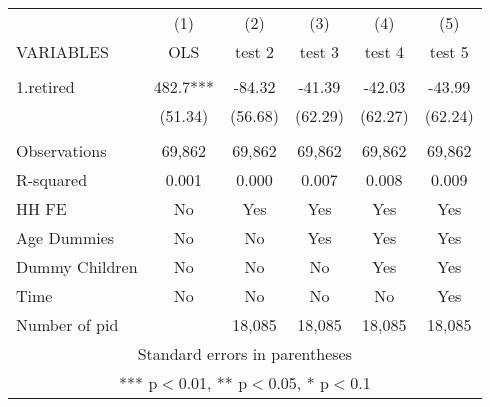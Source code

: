 \begin{tabular}{lccccc} \hline
 & (1) & (2) & (3) & (4) & (5) \\
VARIABLES & OLS & test 2 & test 3 & test 4 & test 5 \\ \hline
 &  &  &  &  &  \\
1.retired & 482.7*** & -84.32 & -41.39 & -42.03 & -43.99 \\
 & (51.34) & (56.68) & (62.29) & (62.27) & (62.24) \\
 &  &  &  &  &  \\
Observations & 69,862 & 69,862 & 69,862 & 69,862 & 69,862 \\
R-squared & 0.001 & 0.000 & 0.007 & 0.008 & 0.009 \\
HH FE & No & Yes & Yes & Yes & Yes \\
Age Dummies & No & No & Yes & Yes & Yes \\
Dummy Children & No & No & No & Yes & Yes \\
Time & No & No & No & No & Yes \\
 Number of pid &  & 18,085 & 18,085 & 18,085 & 18,085 \\ \hline
\multicolumn{6}{c}{ Standard errors in parentheses} \\
\multicolumn{6}{c}{ *** p$<$0.01, ** p$<$0.05, * p$<$0.1} \\
\end{tabular}
